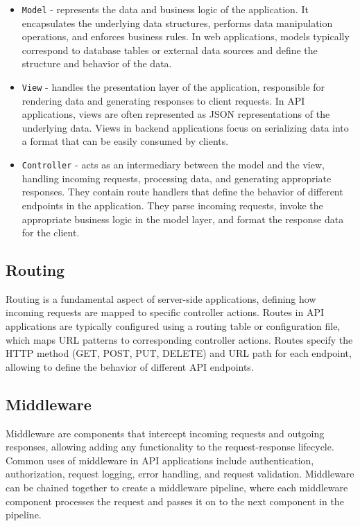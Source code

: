 \documentclass[
  biblatex,
  language=english,
  figures=false,
  sourcecodes,
  glossaries,
  index
]{kidiplom}
\begin{document}
\begin{itemize}
	\item \texttt{Model}  - represents the data and business logic of the application. It encapsulates the underlying data structures, performs data manipulation operations, and enforces business rules. In web applications, models typically correspond to database tables or external data sources and define the structure and behavior of the data.
	\item \texttt{View} - handles the presentation layer of the application, responsible for rendering data and generating responses to client requests. In API applications, views are often represented as JSON representations of the underlying data. Views in backend applications focus on serializing data into a format that can be easily consumed by clients.
	\item \texttt{Controller} - acts as an intermediary between the model and the view, handling incoming requests, processing data, and generating appropriate responses. They contain route handlers that define the behavior of different endpoints in the application. They parse incoming requests, invoke the appropriate business logic in the model layer, and format the response data for the client.
\end{itemize}

\subsection{Routing}
Routing is a fundamental aspect of server-side applications, defining how incoming requests are mapped to specific controller actions. Routes in API applications are typically configured using a routing table or configuration file, which maps URL patterns to corresponding controller actions. Routes specify the HTTP method (GET, POST, PUT, DELETE) and URL path for each endpoint, allowing to define the behavior of different API endpoints.

\subsection{Middleware}
Middleware are components that intercept incoming requests and outgoing responses, allowing adding any functionality to the request-response lifecycle. Common uses of middleware in API applications include authentication, authorization, request logging, error handling, and request validation. Middleware can be chained together to create a middleware pipeline, where each middleware component processes the request and passes it on to the next component in the pipeline.
\end{document}
